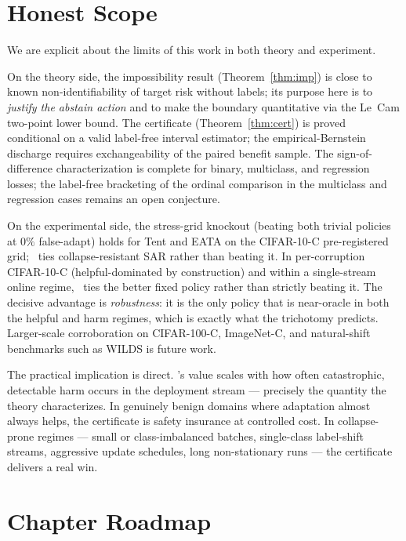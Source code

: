 \section{Honest Scope}\label{sec:intro-scope}

We are explicit about the limits of this work in both theory and experiment.

On the theory side, the impossibility result (Theorem~\ref{thm:imp}) is
close to known non-identifiability of target risk without labels; its
purpose here is to \emph{justify the abstain action} and to make the
boundary quantitative via the Le~Cam two-point lower bound.
The certificate (Theorem~\ref{thm:cert}) is proved conditional on a valid
label-free interval estimator; the empirical-Bernstein discharge requires
exchangeability of the paired benefit sample.
The sign-of-difference characterization is complete for binary, multiclass,
and regression losses; the label-free bracketing of the ordinal comparison
in the multiclass and regression cases remains an open conjecture.

On the experimental side, the stress-grid knockout (beating both trivial
policies at $0\%$ false-adapt) holds for Tent and EATA on the CIFAR-10-C
pre-registered grid; \KGA\ ties collapse-resistant SAR rather than beating
it.
In per-corruption CIFAR-10-C (helpful-dominated by construction) and within
a single-stream online regime, \KGA\ ties the better fixed policy rather
than strictly beating it.
The decisive advantage is \emph{robustness}: it is the only policy that is
near-oracle in both the helpful and harm regimes, which is exactly what
the trichotomy predicts.
Larger-scale corroboration on CIFAR-100-C, ImageNet-C, and natural-shift
benchmarks such as WILDS \cite{koh2021wilds} is future work.

The practical implication is direct.
\KGA's value scales with how often catastrophic, detectable harm occurs in
the deployment stream --- precisely the quantity the theory characterizes.
In genuinely benign domains where adaptation almost always helps, the
certificate is safety insurance at controlled cost.
In collapse-prone regimes --- small or class-imbalanced batches,
single-class label-shift streams, aggressive update schedules, long
non-stationary runs --- the certificate delivers a real win.

\section{Chapter Roadmap}\label{sec:intro-roadmap}

